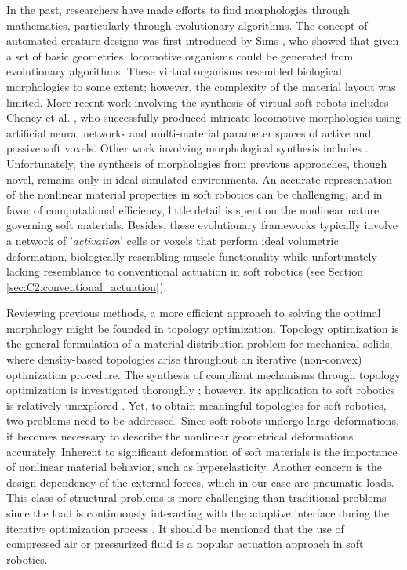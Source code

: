 In the past, researchers have made efforts to find morphologies through mathematics, particularly through evolutionary algorithms. The concept of automated creature designs was first introduced by Sims \cite{Sims1994}, who showed that given a set of basic geometries, locomotive organisms could be generated from evolutionary algorithms. These virtual organisms resembled biological morphologies to some extent; however, the complexity of the material layout was limited. More recent work involving the synthesis of virtual soft robots includes Cheney et al. \cite{Cheney2013}, who successfully produced intricate locomotive morphologies using artificial neural networks and multi-material parameter spaces of active and passive soft voxels. Other work involving morphological synthesis includes \cite{Bern2019, Morzadec2019Apr, Diepen2019}. Unfortunately, the synthesis of morphologies from previous approaches, though novel, remains only in ideal simulated environments. An accurate representation of the nonlinear material properties in soft robotics can be challenging, and in favor of computational efficiency, little detail is spent on the nonlinear nature governing soft materials. Besides, these evolutionary frameworks typically involve a network of '\textit{activation}' cells or voxels that perform ideal volumetric deformation, biologically resembling muscle functionality while unfortunately lacking resemblance to conventional actuation in soft robotics (see Section \ref{sec:C2:conventional_actuation}).

Reviewing previous methods, a more efficient approach to solving the optimal morphology might be founded in topology optimization. Topology optimization is the general formulation of a material distribution problem for mechanical solids, where density-based topologies arise throughout an iterative (non-convex) optimization procedure. The synthesis of compliant mechanisms through topology optimization is investigated thoroughly \cite{Bendsoe2003, Gain2013Dec, Luo2016Mar}; however, its application to soft robotics is relatively unexplored \cite{Zhang2017Topo, Zolfagharian2020Jun, Yuhn2023Feb}. Yet, to obtain meaningful topologies for soft robotics, two problems need to be addressed. Since soft robots undergo large deformations, it becomes necessary to describe the nonlinear geometrical deformations accurately. Inherent to significant deformation of soft materials is the importance of nonlinear material behavior, such as hyperelasticity. Another concern is the design-dependency of the external forces, which in our case are pneumatic loads. This class of structural problems is more challenging than traditional problems since the load is continuously interacting with the adaptive interface during the iterative optimization process \cite{Wang2016, Vasista2013Jul}. It should be mentioned that the use of compressed air or pressurized fluid is a popular actuation approach in soft robotics.

